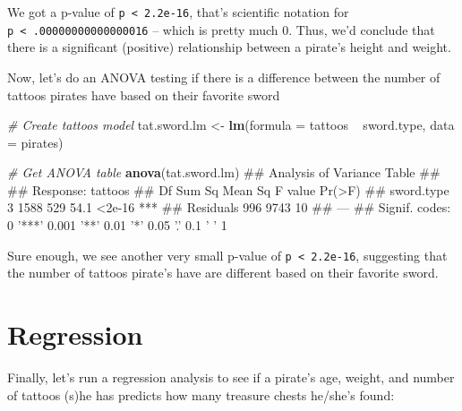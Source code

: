 \documentclass[]{book}
\newenvironment{Shaded}{\begin{snugshade}}{\end{snugshade}}
\newcommand{\KeywordTok}[1]{\textcolor[rgb]{0.13,0.29,0.53}{\textbf{{#1}}}}
\newcommand{\DataTypeTok}[1]{\textcolor[rgb]{0.13,0.29,0.53}{{#1}}}
\newcommand{\StringTok}[1]{\textcolor[rgb]{0.31,0.60,0.02}{{#1}}}
\newcommand{\CommentTok}[1]{\textcolor[rgb]{0.56,0.35,0.01}{\textit{{#1}}}}
\newcommand{\NormalTok}[1]{{#1}}
\theoremstyle{definition}
\theoremstyle{definition}
\theoremstyle{remark}
\begin{document}
We got a p-value of \texttt{p\ \textless{}\ 2.2e-16}, that's scientific
notation for \texttt{p\ \textless{}\ .00000000000000016} -- which is
pretty much 0. Thus, we'd conclude that there is a significant
(positive) relationship between a pirate's height and weight.

Now, let's do an ANOVA testing if there is a difference between the
number of tattoos pirates have based on their favorite sword

\begin{Shaded}
\begin{Highlighting}[]
\CommentTok{# Create tattoos model}
\NormalTok{tat.sword.lm <-}\StringTok{ }\KeywordTok{lm}\NormalTok{(}\DataTypeTok{formula =} \NormalTok{tattoos ~}\StringTok{ }\NormalTok{sword.type,}
                   \DataTypeTok{data =} \NormalTok{pirates)}

\CommentTok{# Get ANOVA table}
\KeywordTok{anova}\NormalTok{(tat.sword.lm)}
\NormalTok{## Analysis of Variance Table}
\NormalTok{## }
\NormalTok{## Response: tattoos}
\NormalTok{##             Df Sum Sq Mean Sq F value Pr(>F)    }
\NormalTok{## sword.type   3   1588     529    54.1 <2e-16 ***}
\NormalTok{## Residuals  996   9743      10                   }
\NormalTok{## ---}
\NormalTok{## Signif. codes:  0 '***' 0.001 '**' 0.01 '*' 0.05 '.' 0.1 ' ' 1}
\end{Highlighting}
\end{Shaded}

Sure enough, we see another very small p-value of
\texttt{p\ \textless{}\ 2.2e-16}, suggesting that the number of tattoos
pirate's have are different based on their favorite sword.

\section{Regression}\label{regression}

Finally, let's run a regression analysis to see if a pirate's age,
weight, and number of tattoos (s)he has predicts how many treasure
chests he/she's found:
\end{document}
